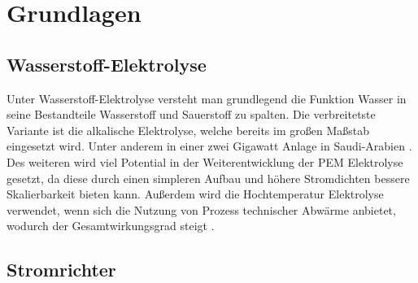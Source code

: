 \chapter{Grundlagen}


\section{Wasserstoff-Elektrolyse}
Unter Wasserstoff-Elektrolyse versteht man grundlegend die Funktion Wasser in seine Bestandteile Wasserstoff und Sauerstoff zu spalten. Die verbreitetste Variante ist die alkalische Elektrolyse, welche bereits im großen Maßstab eingesetzt wird. Unter anderem in einer zwei Gigawatt Anlage in Saudi-Arabien \cite{2GWely} . Des weiteren wird viel Potential in der Weiterentwicklung der PEM Elektrolyse gesetzt, da diese durch einen simpleren Aufbau und höhere Stromdichten bessere Skalierbarkeit bieten kann. Außerdem wird die Hochtemperatur Elektrolyse verwendet, wenn sich die Nutzung von Prozess technischer Abwärme anbietet, wodurch der Gesamtwirkungsgrad steigt \cite{Elektrolyse}.  

\section{Stromrichter}
